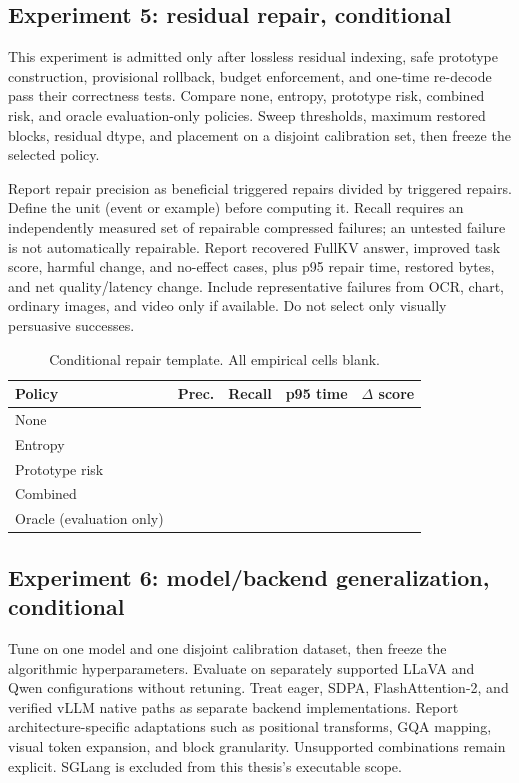 \subsection{Experiment 5: residual repair, conditional}
This experiment is admitted only after lossless residual indexing, safe
prototype construction, provisional rollback, budget enforcement, and one-time
re-decode pass their correctness tests. Compare none, entropy, prototype risk,
combined risk, and oracle evaluation-only policies. Sweep thresholds, maximum
restored blocks, residual dtype, and placement on a disjoint calibration set,
then freeze the selected policy.

Report repair precision as beneficial triggered repairs divided by triggered
repairs. Define the unit (event or example) before computing it. Recall requires
an independently measured set of repairable compressed failures; an untested
failure is not automatically repairable. Report recovered FullKV answer,
improved task score, harmful change, and no-effect cases, plus p95 repair time,
restored bytes, and net quality/latency change. Include representative failures
from OCR, chart, ordinary images, and video only if available. Do not select
only visually persuasive successes.

\begin{table}[h]
\caption{Conditional repair template. All empirical cells blank.}
\small\begin{tabularx}{\columnwidth}{Yrrrr}\toprule
Policy & Prec. & Recall & p95 time & $\Delta$ score\\\midrule
None & & & & \\
Entropy & & & & \\
Prototype risk & & & & \\
Combined & & & & \\
Oracle (evaluation only) & & & & \\
\bottomrule\end{tabularx}
\end{table}

\subsection{Experiment 6: model/backend generalization, conditional}
Tune on one model and one disjoint calibration dataset, then freeze the
algorithmic hyperparameters. Evaluate on separately supported LLaVA and Qwen
configurations without retuning. Treat eager, SDPA, FlashAttention-2, and
verified vLLM native paths as separate backend implementations. Report
architecture-specific adaptations such as positional transforms, GQA mapping,
visual token expansion, and block granularity. Unsupported combinations remain
explicit. SGLang is excluded from this thesis's executable scope.

